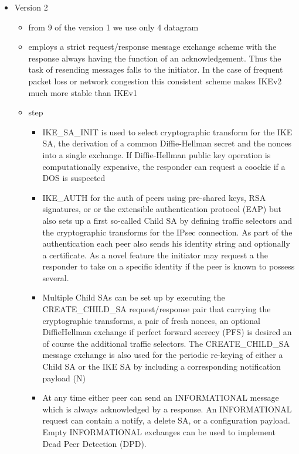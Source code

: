 \documentclass{article}
\begin{document}
\begin{itemize}
\begin{itemize}
\begin{itemize}
        \end{itemize}
        \item Version 2 
        \begin{itemize}
            \item from 9 of the version 1 we use only 4 datagram
            \item employs a strict request/response message exchange scheme with the response always having the function of an acknowledgement. Thus the task of resending messages falls to the initiator. In the case of frequent packet loss or network congestion this consistent scheme makes IKEv2 much more stable than IKEv1
            \item step
            \begin{itemize}
                \item IKE\_SA\_INIT is used to select cryptographic transform for the IKE SA, the derivation of a common Diffie-Hellman secret and the nonces into a single exchange. If Diffie-Hellman public key operation is computationally expensive, the responder can request a coockie if a DOS is suspected 
                \item IKE\_AUTH for the auth of peers using pre-shared keys, RSA signatures, or or the extensible authentication protocol (EAP) but also sets up a first so-called Child SA by defining traffic selectors and the cryptographic transforms for the IPsec connection. As part of the authentication each peer also sends his identity string and optionally a certificate. As a novel feature the initiator may request a the responder to take on a specific identity if the peer is known to possess several.
                \item Multiple Child SAs can be set up by executing the CREATE\_CHILD\_SA request/response pair that carrying the cryptographic transforms, a pair of fresh nonces, an optional DiffieHellman exchange if perfect forward secrecy (PFS) is desired an of course the additional traffic selectors. The CREATE\_CHILD\_SA message exchange is also used for the periodic re-keying of either a Child SA or the IKE SA by including a corresponding notification payload (N)
                \item At any time either peer can send an INFORMATIONAL message which is always acknowledged by a response. An INFORMATIONAL request can contain a notify, a delete SA, or a configuration payload. Empty INFORMATIONAL exchanges can be used to implement Dead Peer Detection (DPD).


\end{itemize}
\end{itemize}
\end{itemize}
\end{itemize}
\end{document}

